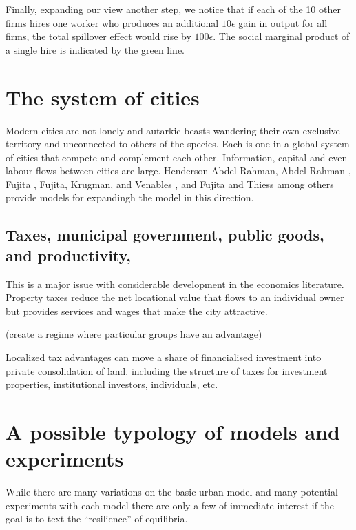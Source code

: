 Finally, expanding our view another step, we notice that if each of the  10 other firms hires one worker who produces an additional  $10\epsilon$ gain in output for all firms, the total spillover effect would rise by $100\epsilon$. The social marginal product of a single hire is indicated by the green line. 



\section{The system of cities}
Modern cities are not lonely and autarkic  beasts wandering their own exclusive territory and unconnected to others of the species. Each is one in a global system of cities that compete and complement each other. Information, capital and even labour flows between cities are large. Henderson Abdel-Rahman\cite{Henderson1972Sizes}, Abdel-Rahman \cite{abdel-rahmanAgglomerationEconomiesTypes1990}, Fujita \cite{fujitaMonopolisticCompetitionModel1988}, Fujita, Krugman, and Venables \cite{fujitaSpatialEconomyCities1999}, and Fujita and Thiess \cite{fujitaEconomicsAgglomeration1996} among others provide models for expandingh the model in this direction.



\subsection{Taxes, municipal government, public goods, and productivity,}
This is a major issue with considerable development in the economics literature. Property taxes reduce the net locational value that flows to an individual owner but provides services and wages that make the city attractive. 

(create a regime where particular groups have an advantage)

Localized tax advantages can move a share of financialised investment into private consolidation of land.
including the structure of taxes for investment properties, institutional investors, individuals, etc.





\section{A possible typology of models and experiments}
While there  are many variations on the basic urban model and many potential experiments with each model there are only a few of immediate interest if the goal is to text the ``resilience'' of equilibria.


